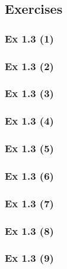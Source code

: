 \subsection*{Exercises}\label{sec:1.3_Exercises}

\subsubsection{Ex 1.3 (1)}\label{sec:Ex_1.3.1}

\subsubsection{Ex 1.3 (2)}\label{sec:Ex_1.3.2}

\subsubsection{Ex 1.3 (3)}\label{sec:Ex_1.3.3}

\subsubsection{Ex 1.3 (4)}\label{sec:Ex_1.3.4}

\subsubsection{Ex 1.3 (5)}\label{sec:Ex_1.3.5}

\subsubsection{Ex 1.3 (6)}\label{sec:Ex_1.3.6}

\subsubsection{Ex 1.3 (7)}\label{sec:Ex_1.3.7}

\subsubsection{Ex 1.3 (8)}\label{sec:Ex_1.3.8}

\subsubsection{Ex 1.3 (9)}\label{sec:Ex_1.3.9}

